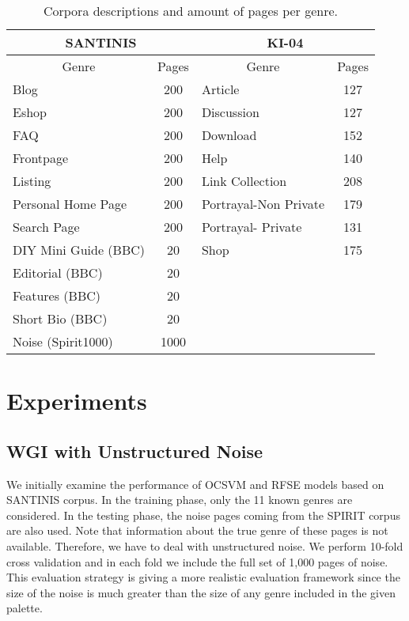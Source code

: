 \documentclass[runningheads]{llncs}
\begin{document}
\begin{table}
\center
\begin{tabular}{|l|l|l|l|}
\hline
\multicolumn{2}{|c|}{SANTINIS} & \multicolumn{2}{c|}{KI-04}\tabularnewline
\hline
\multicolumn{1}{|c|}{Genre} & \multicolumn{1}{c|}{Pages} & \multicolumn{1}{c|}{Genre} & \multicolumn{1}{c|}{Pages}\tabularnewline
\hline
\multicolumn{1}{|l|}{Blog} & \multicolumn{1}{c|}{200} & \multicolumn{1}{l|}{Article} & \multicolumn{1}{c|}{127}\tabularnewline
\multicolumn{1}{|l|}{Eshop} & \multicolumn{1}{c|}{200} & \multicolumn{1}{l|}{Discussion} & \multicolumn{1}{c|}{127}\tabularnewline
\multicolumn{1}{|l|}{FAQ} & \multicolumn{1}{c|}{200} & \multicolumn{1}{l|}{Download} & \multicolumn{1}{c|}{152}\tabularnewline
\multicolumn{1}{|l|}{Frontpage} & \multicolumn{1}{c|}{200} & \multicolumn{1}{l|}{Help} & \multicolumn{1}{c|}{140}\tabularnewline
\multicolumn{1}{|l|}{Listing} & \multicolumn{1}{c|}{200} & \multicolumn{1}{l|}{Link Collection} & \multicolumn{1}{c|}{208}\tabularnewline
\multicolumn{1}{|l|}{Personal Home Page} & \multicolumn{1}{c|}{200} & \multicolumn{1}{l|}{Portrayal-Non Private} & \multicolumn{1}{c|}{179}\tabularnewline
\multicolumn{1}{|l|}{Search Page} & \multicolumn{1}{c|}{200} & \multicolumn{1}{l|}{Portrayal- Private} & \multicolumn{1}{c|}{131}\tabularnewline
\multicolumn{1}{|l|}{DIY Mini Guide (BBC)} & \multicolumn{1}{c|}{20} & \multicolumn{1}{l|}{Shop} & \multicolumn{1}{c|}{175}\tabularnewline
\multicolumn{1}{|l|}{Editorial (BBC)} & \multicolumn{1}{c|}{20} &  & \tabularnewline
\multicolumn{1}{|l|}{Features (BBC)} & \multicolumn{1}{c|}{20} &  & \tabularnewline
\multicolumn{1}{|l|}{Short Bio (BBC)} & \multicolumn{1}{c|}{20} &  & \tabularnewline
\multicolumn{1}{|l|}{Noise (Spirit1000)} & \multicolumn{1}{c|}{1000} &  & \tabularnewline
\hline
\end{tabular}
\caption {Corpora descriptions and amount of pages per genre.}
\label{tbl:genre_tags}
\end{table}


\section{Experiments}\label{sec:Experiments_Results}
\subsection{WGI with Unstructured Noise}\label{sec:WGI_noise}

We initially examine the performance of OCSVM and RFSE models based on SANTINIS corpus. In the training phase, only the 11 known genres are considered. In the testing phase, the noise pages coming from the SPIRIT corpus are also used. Note that information about the true genre of these pages is not available. Therefore, we have to deal with unstructured noise. We perform  10-fold cross validation and in each fold we include the full set of 1,000 pages of noise. This evaluation strategy is giving a more realistic evaluation framework since the size of the noise is much greater than the size of any genre included in the given palette.
\end{document}
